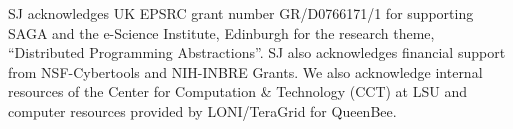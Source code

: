 \documentclass[3p,twocolumn]{elsarticle}
\newcommand{\sagamapreduce }{SAGA-MapReduce }
\begin{document}
SJ acknowledges UK EPSRC grant number GR/D0766171/1 for supporting
SAGA and the e-Science Institute, Edinburgh for the research theme,
``Distributed Programming Abstractions''.  SJ also acknowledges
financial support from NSF-Cybertools and NIH-INBRE Grants. %
We also acknowledge internal resources of the Center for
Computation \& Technology (CCT) at LSU and computer resources provided
by LONI/TeraGrid for QueenBee.  

\end{document}

